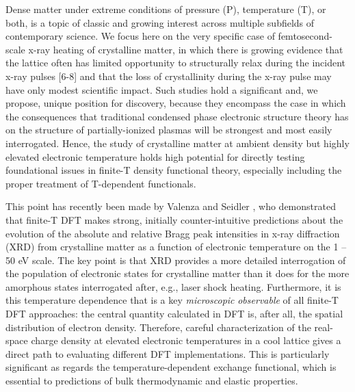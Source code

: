 Dense matter under extreme conditions of pressure (P), temperature (T),
or both, is a topic of classic and growing interest across multiple
subfields of contemporary science. \cite{drake2006high, krishnan1998structure, fortney2009frontiers, glenzer2009x, plasma2003frontiers} We focus here on the very
specific case of femtosecond-scale x-ray heating of crystalline matter,
in which there is growing evidence that the lattice often has limited
opportunity to structurally relax during the incident x-ray pulses
{[}6-8{]} and that the loss of crystallinity during the x-ray pulse may
have only modest scientific impact. \cite{caleman2015ultrafast} Such studies hold a
significant and, we propose, unique position for discovery, because they
encompass the case in which the consequences that traditional condensed
phase electronic structure theory has on the structure of
partially-ionized plasmas will be strongest and most easily
interrogated. Hence, the study of crystalline matter at ambient density
but highly elevated electronic temperature holds high potential for
directly testing foundational issues in finite-T density functional
theory, especially including the proper treatment of T-dependent
functionals. \cite{karasiev2012generalized, karasiev2012comparison, valenza2016warm}

This point has recently been made by Valenza and Seidler \cite{valenza2016warm}, who
demonstrated that finite-T DFT makes strong, initially counter-intuitive
predictions about the evolution of the absolute and relative Bragg peak
intensities in x-ray diffraction (XRD) from crystalline matter as a
function of electronic temperature on the 1 -- 50 eV scale. The key
point is that XRD provides a more detailed interrogation of the
population of electronic states for crystalline matter than it does for
the more amorphous states interrogated after, e.g., laser shock heating.
Furthermore, it is this temperature dependence that is a key
\emph{microscopic} \emph{observable} of all finite-T DFT approaches: the
central quantity calculated in DFT is, after all, the spatial
distribution of electron density. Therefore, careful characterization of
the real-space charge density at elevated electronic temperatures in a
cool lattice gives a direct path to evaluating different DFT
implementations. This is particularly significant as regards the
temperature-dependent exchange functional, which is essential to
predictions of bulk thermodynamic and elastic properties. \cite{karasiev2012generalized, karasiev2012comparison, bredow2000effect}

